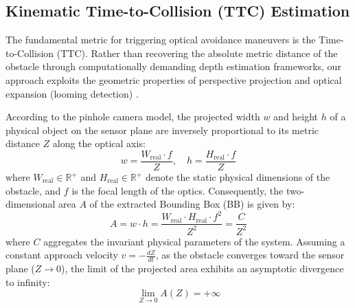 \documentclass[conference]{IEEEtran}
\begin{document}
\subsection{Kinematic Time-to-Collision (TTC) Estimation}
The fundamental metric for triggering optical avoidance maneuvers is the Time-to-Collision ($\text{TTC}$). Rather than recovering the absolute metric distance of the obstacle through computationally demanding depth estimation frameworks, our approach exploits the geometric properties of perspective projection and optical expansion (looming detection) \cite{b13}.

According to the pinhole camera model, the projected width $w$ and height $h$ of a physical object on the sensor plane are inversely proportional to its metric distance $Z$ along the optical axis:
\begin{equation}
    w = \frac{W_{\text{real}} \cdot f}{Z}, \quad h = \frac{H_{\text{real}} \cdot f}{Z}
\end{equation}
where $W_{\text{real}} \in \mathbb{R}^+$ and $H_{\text{real}} \in \mathbb{R}^+$ denote the static physical dimensions of the obstacle, and $f$ is the focal length of the optics. Consequently, the two-dimensional area $A$ of the extracted Bounding Box (BB) is given by:
\begin{equation}
    A = w \cdot h = \frac{W_{\text{real}} \cdot H_{\text{real}} \cdot f^2}{Z^2} = \frac{C}{Z^2}
\end{equation}
where $C$ aggregates the invariant physical parameters of the system. Assuming a constant approach velocity $v = -\frac{dZ}{dt}$, as the obstacle converges toward the sensor plane ($Z \to 0$), the limit of the projected area exhibits an asymptotic divergence to infinity:
\begin{equation}
    \lim_{Z \to 0} A(Z) = +\infty
\end{equation}
\end{document}
